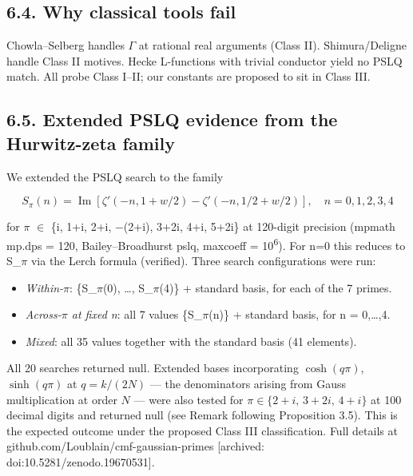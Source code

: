 \documentclass[11pt]{article}
\providecommand{\tightlist}{\setlength{\itemsep}{0pt}\setlength{\parskip}{0pt}}
\begin{document}
\hypertarget{why-classical-tools-fail}{%
\subsection{6.4. Why classical tools
fail}\label{why-classical-tools-fail}}

Chowla--Selberg handles \(\Gamma\) at rational real arguments (Class
II). Shimura/Deligne handle Class II motives. Hecke L-functions with
trivial conductor yield no PSLQ match. All probe Class I--II; our
constants are proposed to sit in Class III.

\hypertarget{extended-pslq-evidence-from-the-hurwitz-zeta-family}{%
\subsection{6.5. Extended PSLQ evidence from the Hurwitz-zeta
family}\label{extended-pslq-evidence-from-the-hurwitz-zeta-family}}

We extended the PSLQ search to the family

\[S_\pi(n) = \operatorname{Im}[\zeta'(-n, 1+w/2) - \zeta'(-n, 1/2+w/2)], \quad n = 0, 1, 2, 3, 4\]

for \(\pi\) \(\in\) \{i, 1+i, 2+i, −(2+i), 3+2i, 4+i, 5+2i\} at
120-digit precision (mpmath mp.dps = 120, Bailey--Broadhurst pslq,
maxcoeff = 10\textsuperscript{6}). For n=0 this reduces to S\_\(\pi\)
via the Lerch formula (verified). Three search configurations were run:

\begin{itemize}
\tightlist
\item
  \emph{Within-\(\pi\)}: \{S\_\(\pi\)(0), \ldots, S\_\(\pi\)(4)\} +
  standard basis, for each of the 7 primes.
\item
  \emph{Across-\(\pi\) at fixed n}: all 7 values \{S\_\(\pi\)(n)\} +
  standard basis, for n = 0,\ldots,4.
\item
  \emph{Mixed}: all 35 values together with the standard basis (41
  elements).
\end{itemize}

All 20 searches returned null. Extended bases incorporating
\(\cosh(q\pi)\), \(\sinh(q\pi)\) at \(q = k/(2N)\) --- the denominators
arising from Gauss multiplication at order \(N\) --- were also tested for
\(\pi \in \{2+i,\, 3+2i,\, 4+i\}\) at 100 decimal digits and returned
null (see Remark following Proposition 3.5). This is the expected outcome under the
proposed Class III classification. Full details at
github.com/Loublain/cmf-gaussian-primes {[}archived:
doi:10.5281/zenodo.19670531{]}.
\end{document}
